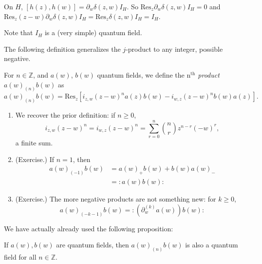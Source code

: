\begin{example}
\label{example-}
On $H$, $[h(z),h(w)]=\partial_w\delta(z,w)I_H$.
So $\text{Res}_z\partial_w\delta(z,w)I_H=0$ and
$\text{Res}_z(z-w)\partial_w\delta(z,w)I_H=
\text{Res}_z\delta(z,w)I_H=I_H$.
\end{example}

Note that $I_H$ is a (very simple) quantum field.

The following definition generalizes the $j$-product to any
integer, possible negative.

\begin{definition}
\label{definition-nth-product}
For $n \in \mathbb{Z}$, and $a(w)$, $b(w)$ quantum fields,
we define the {\it $\text{n}^{\text{th}}$ product} $a(w)_{(n)}b(w)$ as
$$
a(w)_{(n)}b(w)=\text{Res}_z
[i_{z,w}(z-w)^na(z)b(w)-i_{w,z}(z-w)^nb(w)a(z)].
$$
\end{definition}

\begin{remark}
\label{remark-nth-product}
\begin{enumerate}
\item We recover the prior definition: if $n \geq 0$,
$$
i_{z,w}(z-w)^n=i_{w,z}(z-w)^n=\sum_{r=0}^n\binom{n}{r}z^{n-r}(-w)^r,
$$
a finite sum.
\item (Exercise.) If $n=1$, then
\begin{align*}
a(w)_{(-1)}b(w)&=a(w)_+b(w)+b(w)a(w)_-\\
&=:\! a(w)b(w)\!:
\end{align*}

\item (Exercise.) 
The more negative products are not something new:
for $k \geq 0$,
$$
a(w)_{(-k-1)}b(w)=:\!(\partial_w^{(k)}a(w))b(w)\!:
$$
\end{enumerate}
\end{remark}

We have actually already used the following proposition:

\begin{proposition}
\label{proposition-nth-product-is-quantum-field}
If $a(w),b(w)$ are quantum fields, then $a(w)_{(n)}b(w)$
is also a quantum field for all $n \in \mathbb{Z}$.
\end{proposition}

